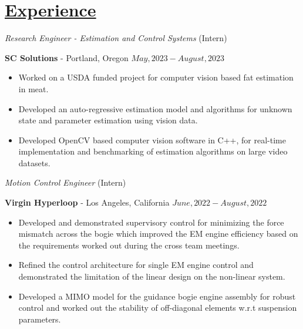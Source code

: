 \section*{\underline{Experience}}
\noindent\textit{Research Engineer  - Estimation and Control Systems} (Intern)

\textbf{SC Solutions} - Portland, Oregon \hfill $May, 2023 - August, 2023$

\begin{itemize}
    \item Worked on a USDA funded project for computer vision based fat estimation in meat.
    \item Developed an auto-regressive estimation model and algorithms for unknown state and parameter estimation using vision data.
    \item Developed OpenCV based computer vision software in C++, for real-time implementation and benchmarking of estimation algorithms on large video datasets.
\end{itemize}

\medskip

\noindent \textit{Motion Control Engineer } (Intern)

\textbf{Virgin Hyperloop} - Los Angeles, California \hfill $June, 2022  - August, 2022$

\begin{itemize}
        \item Developed and demonstrated supervisory control for minimizing the force mismatch across the bogie which
        improved the  EM engine efficiency based on the requirements worked out during the cross team meetings.
        \item Refined the control architecture for single EM engine control and demonstrated the limitation of the linear design on the non-linear system.
        \item Developed a MIMO model for the guidance bogie engine assembly for robust control and worked out the stability of off-diagonal
        elements w.r.t suspension parameters.
\end{itemize}


